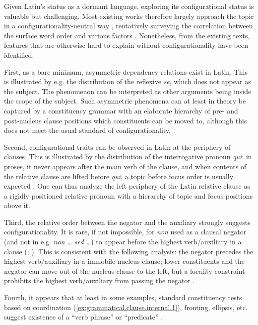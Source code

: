 \documentclass[a4paper, oneside, 12pt]{report}
\newcommand*{\citepage}[1]{p.~{#1}}
\newcommand*{\citepages}[1]{pp.~{#1}}
\newcommand{\form}[1]{\emph{#1}}
\begin{document}
Given Latin's status as a dormant language, exploring its configurational status is valuable but challenging.
Most existing works therefore largely approach the topic in a configurationality-neutral way 
\citep[\citepages{9-12}]{danckaert2017development},
tentatively surveying the correlation between the surface word order and various factors \citep[\citepages{948-967}]{pinkster2}.
Nonetheless, from the existing texts, features that are otherwise hard to explain without configurationality have been identified.

First, as a bare minimum, asymmetric dependency relations exist in Latin. 
This is illustrated by e.g. the distribution of the reflexive \form{se},
which does not appear as the subject.
The phenomenon can be interpreted as other arguments being inside the scope of the subject.
Such asymmetric phenomena can at least in theory be captured by a constituency grammar with an elaborate hierarchy of pre- and post-nucleus clause positions which constituents can be moved to,
although this does not meet the usual standard of configurationality.

Second, configurational traits can be observed in Latin at the periphery of clauses.
This is illustrated by the distribution of the interrogative pronoun \form{qui}:
in proses, it never appears after the main verb of the clause,
and when contents of the relative clause are lifted before \form{qui},
a topic before focus order is usually expected \citep[\citepages{19-20}]{danckaert2017development}.
One can thus analyze the left periphery of the Latin relative clause as 
a rigidly positioned relative pronoun with a hierarchy of topic and focus positions above it.

Third, the relative order between the negator and the auxiliary strongly suggests configurationality.
It is rare, if not impossible, for \form{non} used as a clausal negator (and not in e.g. \form{non \dots{} sed \dots}) to appear before the highest verb/auxiliary in a clause (\citealt[\citepages{39-44}]{danckaert2017development}; \citealt[\citepage{183}]{devine2006latin}).
This is consistent with the following analysis: 
the negator precedes the highest verb/auxiliary in a immobile nucleus clause;
lower constituents and the negator can move out of the nucleus clause to the left,
but a locality constraint prohibits the highest verb/auxiliary from passing the negator
\citep[\citepages{60-62}]{danckaert2017development}.

Fourth, it appears that at least in some examples, standard constituency tests based on coordination (\ref{ex:grammatical.clause.internal.1}), fronting, ellipsis, etc. suggest existence of a ``verb phrase'' or ``predicate'' \citep[\citepages{68-73}]{danckaert2017development}.
\end{document}
